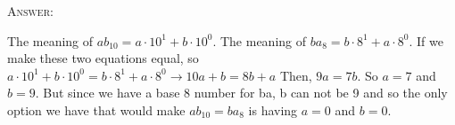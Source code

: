 \textsc{Answer:}\vspace{-2mm}
\begin{answerlong}
The meaning of $ab_{10} = a \cdot 10^{1} + b \cdot 10^{0}$.
The meaning of $ba_{8} = b \cdot 8^{1} + a \cdot 8^{0}$.
If we make these two equations equal, so
$a \cdot 10^{1} + b \cdot 10^{0} = b \cdot 8^{1} + a \cdot 8^{0} \rightarrow 10a + b = 8b + a$
Then, $9a = 7b$. So $a = 7$ and $b = 9$. But since we have a base 8 number for ba, b can not be 9 and so the only option we have that would make $ ab_{10} = ba_{8} $ is having $ a = 0 $ and $ b = 0 $.
\end{answerlong}

